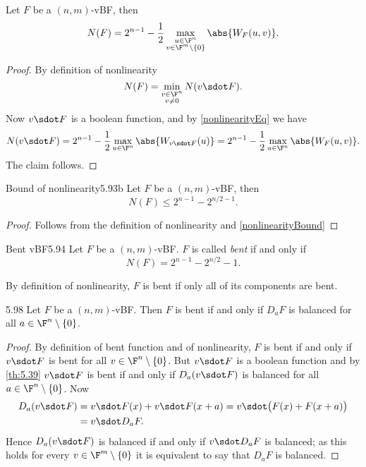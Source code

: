 \begin{pr}
	Let \(F\) be a \((n,m)\)-vBF, then
	\[
		N(F) = 2^{n-1}-\frac{1}{2}\max_{\substack{u\in\F^n\\v\in\F^m\setminus\{0\}}}\abs{W_F(u,v)}.
	\]
\end{pr}

\begin{proof}
	By definition of nonlinearity
	\[
		N(F) = \min_{\substack{v \in \F^n\\v\neq 0}}N(v\sdot F).
	\]
	Now \(v\sdot F\) is a boolean function, and by \autoref{nonlinearityEq} we have
	\[
		N(v\sdot F) = 2^{n-1}-\frac{1}{2}\max_{u\in\F^n}\abs{W_{v\sdot F}(u)} = 2^{n-1}-\frac{1}{2}\max_{u\in\F^n}\abs{W_F(u,v)}.
	\]
	The claim follows.
\end{proof}

\begin{teor}{Bound of nonlinearity}{5.93b}
	Let \(F\) be a \((n,m)\)-vBF, then
	\[
		N(F) \le 2^{n-1}-2^{n/2-1}.
	\]
\end{teor}

\begin{proof}
	Follows from the definition of nonlinearity and \autoref{nonlinearityBound}
\end{proof}

\begin{defn}{Bent vBF}{5.94}
	Let \(F\) be a \((n,m)\)-vBF. \(F\) is called \emph{bent} if and only if
	\[
		N(F) = 2^{n-1}-2^{n/2}-1.
	\]
\end{defn}

\begin{oss}
	By definition of nonlinearity, \(F\) is bent if only all of its components are bent.
\end{oss}

\begin{prop}{}{5.98}
	Let \(F\) be a \((n,m)\)-vBF. Then \(F\) is bent if and only if \(D_a F\) is balanced for all \(a \in \F^n\setminus\{0\}\).
\end{prop}

\begin{proof}
	By definition of bent function and of nonlinearity, \(F\) is bent if and only if \(v\sdot F\) is bent for all \(v\in\F^n\setminus\{0\}\). But \(v\sdot F\) is a boolean function and by \autoref{th:5.39} \(v\sdot F\) is bent if and only if \(D_a(v\sdot F)\) is balanced for all \(a \in \F^n\setminus\{0\}\). Now
	\begin{align*}
		D_a(v\sdot F) & = v\sdot F(x) + v\sdot F(x+a) = v\sdot \big(F(x)+F(x+a)\big) \\
		              & = v\sdot D_a F.
	\end{align*}
	Hence \(D_a(v\sdot F)\) is balanced if and only if \(v\sdot D_a F\) is balanced; as this holds for every \(v\in\F^m\setminus\{0\}\) it is equivalent to say that \(D_a F\) is balanced.
\end{proof}

